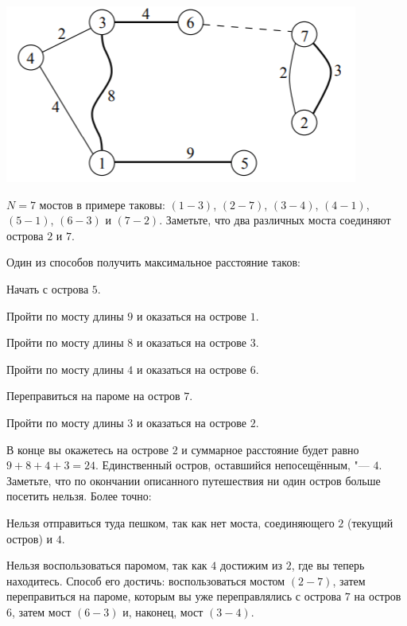\includegraphics{islands.png}

$N = 7$ мостов в примере таковы: $(1-3)$, $(2-7)$, $(3-4)$, $(4-1)$, $(5-1)$,
$(6-3)$ и $(7-2)$. Заметьте, что два различных моста соединяют острова $2$ и
$7$.

Один из способов получить максимальное расстояние таков:

\begin{shortitems}
  \item Начать с острова $5$.
  \item Пройти по мосту длины $9$ и оказаться на острове $1$.
  \item Пройти по мосту длины $8$ и оказаться на острове $3$.
  \item Пройти по мосту длины $4$ и оказаться на острове $6$.
  \item Переправиться на пароме на остров $7$.
  \item Пройти по мосту длины $3$ и оказаться на острове $2$.
\end{shortitems}

В конце вы окажетесь на острове $2$ и суммарное расстояние будет равно
$9+8+4+3 = 24$. Единственный остров, оставшийся непосещённым, "--- $4$.
Заметьте, что по окончании описанного путешествия ни один остров больше
посетить нельзя. Более точно:

\begin{shortitems}
  \item Нельзя отправиться туда пешком, так как нет моста, соединяющего $2$
    (текущий остров) и $4$.
  \item Нельзя воспользоваться паромом, так как $4$ достижим из $2$, где вы
    теперь находитесь. Способ его достичь: воспользоваться мостом $(2-7)$,
    затем переправиться на пароме, которым вы уже переправлялись с острова
    $7$ на остров $6$, затем мост $(6-3)$ и, наконец, мост $(3-4)$.
\end{shortitems}
